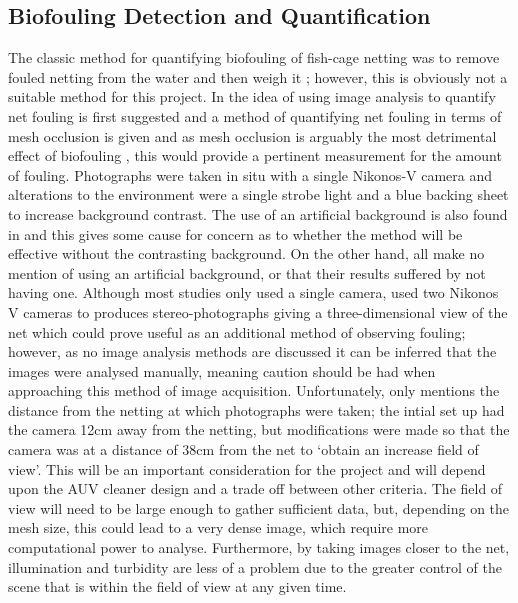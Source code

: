 \documentclass[11.5pt, twoside, a4paper]{article}
\begin{document}
\subsection{Biofouling Detection and Quantification}
The classic method for quantifying biofouling of fish-cage netting was to remove fouled netting from the water and then weigh it \cite{hodson1995situ}; however, this is obviously not a suitable method for this project. In \cite{hodson2000biofouling} the idea of using image analysis to quantify net fouling is first suggested and a method of quantifying net fouling in terms of mesh occlusion is given and as mesh occlusion is arguably the most detrimental effect of biofouling \cite{beveridge2008cage,fitridge2012impact,braithwaite2004marine}, this would provide a pertinent measurement for the amount of fouling.  Photographs were taken in situ with a single Nikonos-V camera and alterations to the environment were a single strobe light and a blue backing sheet to increase background contrast. The use of an artificial background is also found in \cite{braithwaite2007biofouling,edwards2015effectiveness} and this gives some cause for concern as to whether the method will be effective without the contrasting background. On the other hand, \cite{guenther2010development,svane2006test} all make no mention of using an artificial background, or that their results suffered by not having one. Although most studies \cite{braithwaite2007biofouling,guenther2010development,edwards2015effectiveness,gansel2015drag} only used a single camera, \cite{svane2006test} used two Nikonos V cameras to produces stereo-photographs giving a three-dimensional view of the net which could prove useful as an additional method of observing fouling; however, as no image analysis methods are discussed it can be inferred that the images were analysed manually, meaning caution should be had when approaching this method of image acquisition. Unfortunately, only \cite{guenther2010development} mentions the distance from the netting at which photographs were taken; the intial set up had the camera 12cm away from the netting, but modifications were made so that the camera was at a distance of 38cm from the net to `obtain an increase field of view'. This will be an important consideration for the project and will depend upon the AUV cleaner design and a trade off between other criteria. The field of view will need to be large enough to gather sufficient data, but, depending on the mesh size, this could lead to a very dense image, which require more computational power to analyse. Furthermore, by taking images closer to the net, illumination and turbidity are less of a problem due to the greater control of the scene that is within the field of view at any given time.
\end{document}
